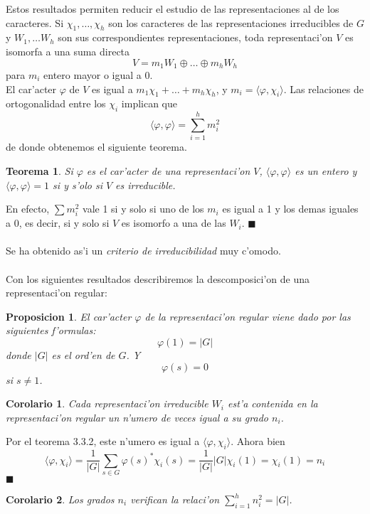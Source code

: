 \documentclass[a4paper,openright,12pt]{report}
\numberwithin{equation}{section} %
\newtheorem{teorema}{Teorema}[section] %
\newtheorem{proposicion}{Proposicion}[section] %
\newtheorem{corolario}{Corolario}[section] %
\newenvironment{proof}{\noindent{\it Demostracion:}}{\hfill$\blacksquare$} %
\begin{document}
Estos resultados permiten reducir el estudio de las representaciones al de los caracteres. Si $\chi_{1}, \ldots ,\chi_{h}$ son los caracteres de las representaciones irreducibles de $G$ y $W_{1}, \ldots W_{h}$ son sus correspondientes representaciones, toda representaci'on $V$ es isomorfa a una suma directa
\[
V=m_{1}W_{1} \oplus \ldots \oplus m_{h}W_{h}
\]
para $m_{i}$ entero mayor o igual a 0.\\
El car'acter $\varphi$ de $V$ es igual a $m_{1}\chi_{1}+\ldots + m_{h}\chi_{h}$, y $m_{i}=\langle \varphi , \chi_{i} \rangle$. Las relaciones de ortogonalidad entre los $\chi_{i}$ implican que
\[
\langle \varphi , \varphi \rangle = \sum_{i=1}^{h}m_{i}^{2}
\]
de donde obtenemos el siguiente teorema.
\begin{teorema}
Si $\varphi$ es el car'acter de una representaci'on $V$, $\langle \varphi, \varphi \rangle$ es un entero y $\langle \varphi, \varphi \rangle =1$ si y s'olo si $V$ es irreducible.
\end{teorema}
\begin{proof}
En efecto, $\sum m_{i}^{2}$ vale 1 si y solo si uno de los $m_{i}$ es igual a 1 y los demas iguales a 0, es decir, si y solo si $V$ es isomorfo a una de las $W_{i}$.
\end{proof}\\
\\
Se ha obtenido as'i un \emph{criterio de irreducibilidad} muy c'omodo.\\
\\
Con los siguientes resultados describiremos la descomposici'on de una representaci'on regular:
\begin{proposicion}
El car'acter $\varphi$ de la representaci'on regular viene dado por las siguientes f'ormulas:
\[
\varphi (1) = |G|
\]
donde $|G|$ es el ord'en de $G$. Y
\[
\varphi (s)=0
\]
si $s \neq 1$.
\end{proposicion}
\begin{corolario}
Cada representaci'on irreducible $W_{i}$ est'a contenida en la representaci'on regular un n'umero de veces igual a su grado $n_{i}$.
\end{corolario}
\begin{proof}
Por el teorema 3.3.2, este n'umero es igual a $\langle \varphi , \chi_{i} \rangle$. Ahora bien
\[
\langle \varphi , \chi_{i} \rangle = \frac{1}{|G|}\sum_{s \in G} \varphi (s)^{*} \chi_{i} (s) = \frac{1}{|G|}|G|\chi_{i}(1)=\chi_{i}(1)=n_{i} 
\]
\end{proof}
\begin{corolario}
Los grados $n_{i}$ verifican la relaci'on $\sum_{i=1}^{h}n_{i}^{2}=|G|$.
\end{corolario}
\end{document}
